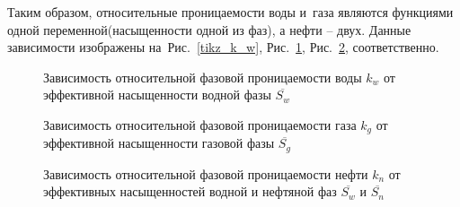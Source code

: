 Таким образом, относительные проницаемости воды и~газа являются функциями одной 
переменной(насыщенности одной из фаз), а нефти -- двух. Данные зависимости
изображены на~Рис.~\ref{tikz_k_w}, Рис.~\ref{tikz_k_g}, Рис.~\ref{tikz_k_n},
соответственно.

\begin{figure}[h]
\begin{minipage}[h]{0.49\linewidth}
\caption{Зависимость относительной фазовой проницаемости воды $k_w$
  от эффективной насыщенности водной фазы $\overline{S_w}$}
\label{tikz_k_w}
\end{minipage}
\hfill
\begin{minipage}[h]{0.49\linewidth}
\caption{Зависимость относительной фазовой проницаемости газа $k_g$ 
  от эффективной насыщенности газовой фазы $\overline{S_g}$}
\label{tikz_k_g}
\end{minipage}
\end{figure}

\begin{figure}[h]
\begin{center}
\caption{Зависимость относительной фазовой проницаемости нефти $k_n$ 
  от эффективных насыщенностей водной и нефтяной фаз $\overline{S_w}$ и $\overline{S_n}$}
\label{tikz_k_n}
\end{center}
\end{figure}

